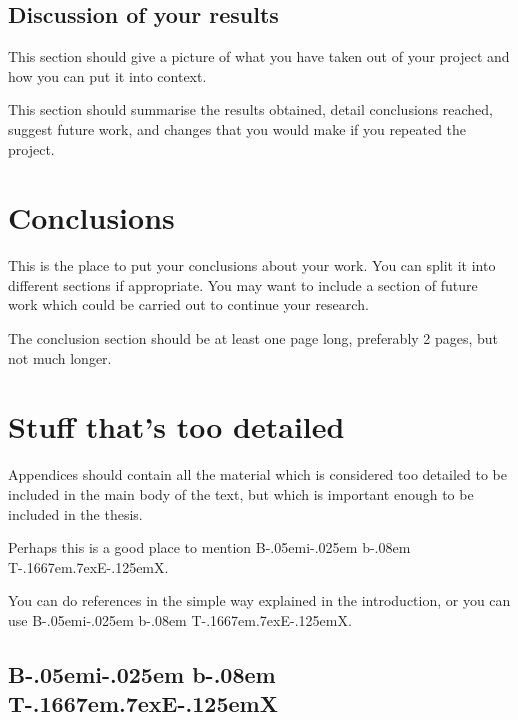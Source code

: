 \documentclass[12pt,a4paper]{report}
\def\BibTeX{{\rm B\kern-.05em{\sc i\kern-.025em b}\kern-.08em
    T\kern-.1667em\lower.7ex\hbox{E}\kern-.125emX}}
\begin{document}
\section{Discussion of your results}

This section should give a picture of what you have taken out of your
project and how you can put it into context.

This section should summarise the results obtained, detail conclusions
reached, suggest future work, and changes that you would make if you
repeated the project.

\chapter{Conclusions}

This is the place to put your conclusions about your work. You can
split it into different sections if appropriate. You may want to include
a section of future work which could be carried out to continue your
research.

The conclusion section should be at least one page long, preferably 2
pages, but not much longer.

\appendix

\chapter{Stuff that's too detailed}

Appendices should contain all the material which is considered too
detailed to be included in the main body of the text, but which is
important enough to be included in the thesis.

Perhaps this is a good place to mention \BibTeX.

You can do references in the simple way explained in the introduction,
or you can use \BibTeX.


\section{\BibTeX}
\label{sec:bibtex}
\end{document}

